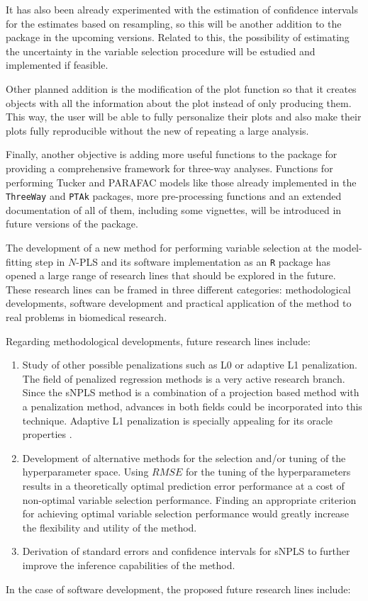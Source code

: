 It has also been already experimented with the estimation of confidence intervals for the estimates based on resampling, so this will be another addition to the package in the upcoming versions. Related to this, the possibility of estimating the uncertainty in the variable selection procedure will be estudied and implemented if feasible.

Other planned addition is the modification of the plot function so that it creates objects with all the information about the plot instead of only producing them. This way, the user will be able to fully personalize their plots and also make their plots fully reproducible without the new of repeating a large analysis.

Finally, another objective is adding more useful functions to the package for providing a comprehensive framework for three-way analyses. Functions for performing Tucker and PARAFAC models like those already implemented in the \texttt{ThreeWay} and \texttt{PTAk} packages, more pre-processing functions and an extended documentation of all of them, including some vignettes, will be introduced in future versions of the package.

The development of a new method for performing variable selection at the model-fitting step in $N$-PLS and its software implementation as an \texttt{R} package has opened a large range of research lines that should be explored in the future. These research lines can be framed in three different categories: methodological developments, software development and practical application of the method to real problems in biomedical research.

Regarding methodological developments, future research lines include:

\begin{enumerate}
    \item Study of other possible penalizations such as L0 or adaptive L1 penalization. The field of penalized regression methods is a very active research branch. Since the sNPLS method is a combination of a projection based method with a penalization method, advances in both fields could be incorporated into this technique. Adaptive L1 penalization is specially appealing for its oracle properties \parencite{zou2006adaptive}.
    \item Development of alternative methods for the selection and/or tuning of the hyperparameter space. Using $RMSE$ for the tuning of the hyperparameters results in a theoretically optimal prediction error performance at a cost of non-optimal variable selection performance. Finding an appropriate criterion for achieving optimal variable selection performance would greatly increase the flexibility and utility of the method.
    \item Derivation of standard errors and confidence intervals for sNPLS to further improve the inference capabilities of the method.
\end{enumerate}
\vspace{10pt}
In the case of software development, the proposed future research lines include:

